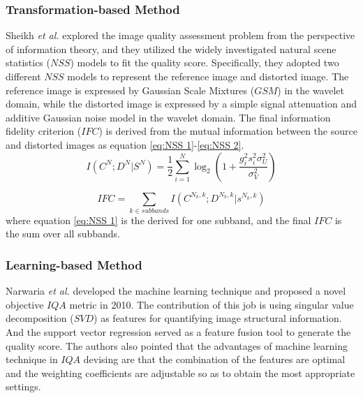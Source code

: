 \documentclass[journal]{IEEEtran}
\begin{document}
\subsubsection{Transformation-based Method}
Sheikh \textit{et al.} \cite{SheiNSSFR} explored the image quality assessment problem from the perspective of information theory, and they utilized the widely investigated natural scene statistics ($NSS$) models to fit the quality score. Specifically, they adopted two different $NSS$ models to represent the reference image and distorted image. The reference image is expressed by Gaussian Scale Mixtures ($GSM$) in the wavelet domain, while the distorted image is expressed by a simple signal attenuation and additive Gaussian noise model in the wavelet domain. The final information fidelity criterion ($IFC$) is derived from the mutual information between the source and distorted images as equation \ref{eq:NSS 1}-\ref{eq:NSS 2}.
\begin{equation}
I(C^N; D^N | S^N) = \frac{1}{2} \sum\limits_{i=1}^{N}\log_2(1+\frac{g_i^2 s_i^2 \sigma_U^2}{\sigma_V^2})
\label{eq:NSS 1}
\end{equation}

\begin{equation}
IFC = \sum_{k \in subbands}I(C^{N_k,k};D^{N_k,k}|s^{N_k,k})
\label{eq:NSS 2}
\end{equation}
where equation \ref{eq:NSS 1} is the derived for one subband, and the final $IFC$ is the sum over all subbands.



\subsubsection{Learning-based Method}
Narwaria \textit{et al.} \cite{NarwariaFR} developed the machine learning technique and proposed a novel objective $IQA$ metric in 2010. The contribution of this job is using singular value decomposition ($SVD$) as features for quantifying image structural information. And the support vector regression served as a feature fusion tool to generate the quality score. The authors also pointed that the advantages of machine learning technique in $IQA$ devising are that the combination of the features are optimal and the weighting coefficients are adjustable so as to obtain the most appropriate settings.
\end{document}
